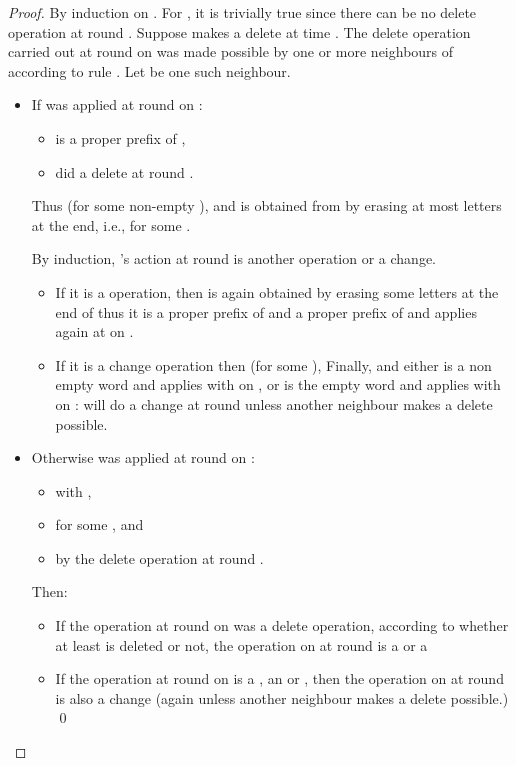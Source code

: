 \documentclass[11pt,envcountsame,letterpaper]{llncs}
\begin{document}
\begin{proof}
By induction on . For , it is trivially true since there can be no
delete operation at round .
Suppose  makes a delete at time .
The delete operation  carried out 
at round  on  was made
possible by one or more neighbours of  according to rule
. Let  be one such neighbour.


\begin{itemize}
\item
If  was applied at round  on :
\begin{itemize}
\item   is a proper prefix of ,
\item  did a delete at round .
\end{itemize}
Thus 
 (for some
non-empty ), and
 is obtained from   by erasing at most 
letters at the end, i.e.,  for some .

By induction, 's action at round  is another  operation
or a change.
\begin{itemize}
\item If it is a  operation, 
then   is again obtained 
by erasing some letters at the end of 
thus it is a proper prefix of    and 
a proper prefix
of  and  
applies again at  on .
\item 
If it is a change operation then  (for some ), 
 Finally, 
and  either  is a non empty word and  applies with 
on ,
or  is the empty word and
 applies with  on :  will do a change at round  unless another neighbour makes a delete possible.
\end{itemize}
\item
Otherwise  was applied at round  on : 
\begin{itemize}
\item   with ,
\item  for some , and 
\item  by the delete operation at round .
\end{itemize}
Then:
\begin{itemize}
\item If the operation at round  on  was a delete operation,
according to whether
at least  is deleted or not, the operation on  at round 
 is
a   or a 
\item If the operation at round  on  is a , an 
or , then the operation on  at round
 is also a change (again unless
another neighbour makes a delete possible.)
\qed
\end{itemize}
\end{itemize}
\end{proof}
\end{document}
